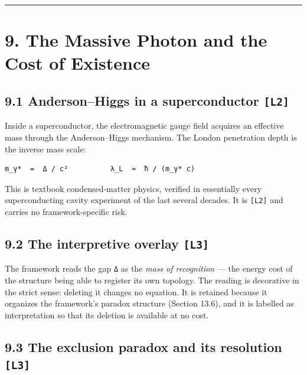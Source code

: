 \documentclass[
  11pt]{report}
\begin{document}
\begin{center}\rule{0.5\linewidth}{0.5pt}\end{center}

\hypertarget{the-massive-photon-and-the-cost-of-existence}{%
\chapter{9. The Massive Photon and the Cost of
Existence}\label{the-massive-photon-and-the-cost-of-existence}}

\hypertarget{andersonhiggs-in-a-superconductor-l2}{%
\section{\texorpdfstring{9.1 Anderson--Higgs in a superconductor
\texttt{{[}L2{]}}}{9.1 Anderson--Higgs in a superconductor {[}L2{]}}}\label{andersonhiggs-in-a-superconductor-l2}}

Inside a superconductor, the electromagnetic gauge field acquires an
effective mass through the Anderson--Higgs mechanism. The London
penetration depth is the inverse mass scale:

\begin{verbatim}
m_γ*  =  Δ / c²          λ_L  ≈  ħ / (m_γ* c)
\end{verbatim}

This is textbook condensed-matter physics, verified in essentially every
superconducting cavity experiment of the last several decades. It is
\texttt{{[}L2{]}} and carries no framework-specific risk.

\hypertarget{the-interpretive-overlay-l3}{%
\section{\texorpdfstring{9.2 The interpretive overlay
\texttt{{[}L3{]}}}{9.2 The interpretive overlay {[}L3{]}}}\label{the-interpretive-overlay-l3}}

The framework reads the gap \texttt{Δ} as the \emph{mass of recognition}
--- the energy cost of the structure being able to register its own
topology. The reading is decorative in the strict sense: deleting it
changes no equation. It is retained because it organizes the framework's
paradox structure (Section 13.6), and it is labelled as interpretation
so that its deletion is available at no cost.

\hypertarget{the-exclusion-paradox-and-its-resolution-l3}{%
\section{\texorpdfstring{9.3 The exclusion paradox and its resolution
\texttt{{[}L3{]}}}{9.3 The exclusion paradox and its resolution {[}L3{]}}}\label{the-exclusion-paradox-and-its-resolution-l3}}
\end{document}
